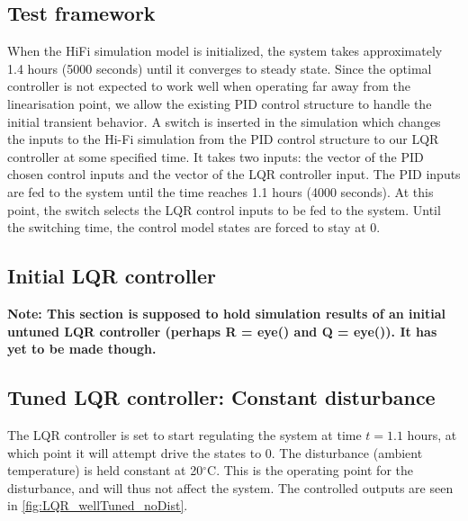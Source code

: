 \subsection{Test framework}
When the HiFi simulation model is initialized, the system takes approximately 1.4 hours (5000 seconds) until it converges to steady state. Since the optimal controller is not expected to work well when operating far away from the linearisation point, we allow the existing PID control structure to handle the initial transient behavior.
A switch is inserted in the simulation which changes the inputs to the Hi-Fi simulation from the PID control structure to our LQR controller at some specified time. It takes two inputs: the vector of the PID chosen control inputs and the vector of the LQR controller input. The PID inputs are fed to the system until the time reaches 1.1 hours (4000 seconds). At this point, the switch selects the LQR control inputs to be fed to the system. Until the switching time, the control model states are forced to stay at 0. \\

\subsection{Initial LQR controller}
\textbf{Note: This section is supposed to hold simulation results of an initial untuned LQR controller (perhaps R = eye() and Q = eye()). It has yet to be made though.}


\subsection{Tuned LQR controller: Constant disturbance}
The LQR controller is set to start regulating the system at time $t=1.1$ hours, at which point it will attempt drive the states to 0. The disturbance (ambient temperature) is held constant at 20$^{\circ}$C. This is the operating point for the disturbance, and will thus not affect the system. The controlled outputs are seen in \cref{fig:LQR_wellTuned_noDist}.\\


